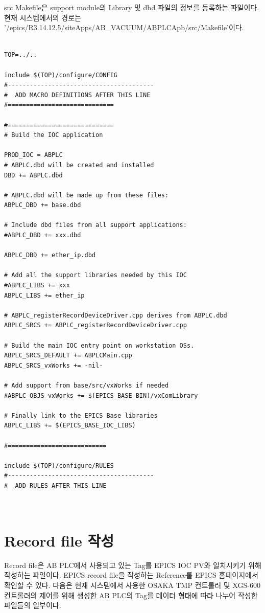 \documentclass[11pt
  , a4paper
  , article
  , oneside
]{memoir}
\begin{document}
src Makefile은 support module의 Library 및 dbd 파일의 정보를 등록하는 파일이다. 현재 시스템에서의 경로는 '/epics/R3.14.12.5/siteApps/AB\_VACUUM/ABPLCApb/src/Makefile'이다.\

\begin{lstlisting}[style=termstyle]

TOP=../..

include $(TOP)/configure/CONFIG
#----------------------------------------
#  ADD MACRO DEFINITIONS AFTER THIS LINE
#=============================

#=============================
# Build the IOC application

PROD_IOC = ABPLC
# ABPLC.dbd will be created and installed
DBD += ABPLC.dbd

# ABPLC.dbd will be made up from these files:
ABPLC_DBD += base.dbd

# Include dbd files from all support applications:
#ABPLC_DBD += xxx.dbd

ABPLC_DBD += ether_ip.dbd

# Add all the support libraries needed by this IOC
#ABPLC_LIBS += xxx
ABPLC_LIBS += ether_ip

# ABPLC_registerRecordDeviceDriver.cpp derives from ABPLC.dbd
ABPLC_SRCS += ABPLC_registerRecordDeviceDriver.cpp

# Build the main IOC entry point on workstation OSs.
ABPLC_SRCS_DEFAULT += ABPLCMain.cpp
ABPLC_SRCS_vxWorks += -nil-

# Add support from base/src/vxWorks if needed
#ABPLC_OBJS_vxWorks += $(EPICS_BASE_BIN)/vxComLibrary

# Finally link to the EPICS Base libraries
ABPLC_LIBS += $(EPICS_BASE_IOC_LIBS)

#===========================

include $(TOP)/configure/RULES
#----------------------------------------
#  ADD RULES AFTER THIS LINE



\end{lstlisting}


\section{Record file 작성}

Record file은 AB PLC에서 사용되고 있는 Tag를 EPICS IOC PV와 일치시키기 위해 작성하는 파일이다. EPICS record file을 작성하는 Reference를 EPICS 홈페이지에서 확인할 수 있다. 다음은 현재 시스템에서 사용한 OSAKA TMP 컨트롤러 및 XGS-600 컨트롤러의 제어를 위해 생성한 AB PLC의 Tag를 데이터 형태에 따라 나누어 작성한 파일들의 일부이다.\\
\end{document}
